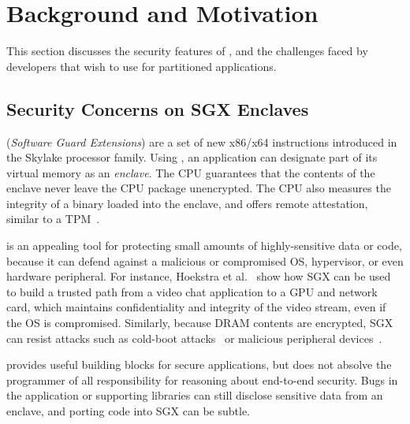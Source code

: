 \section{Background and Motivation}
\label{sec:background}

This section discusses the security features of  \sgx{}, and the challenges faced by developers that
wish to use \sgx{} for partitioned \java{} applications.

\subsection{Security Concerns on SGX Enclaves}

\intel{} \sgx{} ({\it Software Guard Extensions})
are a set of new x86/x64 instructions
introduced in the \intel{} Skylake processor family.
Using \sgx{}, an 
application can designate part of its virtual memory as an {\em enclave}.
The CPU guarantees that the contents of the enclave never leave the CPU package unencrypted.
The CPU also measures the integrity of a binary loaded into the enclave, and offers remote attestation,
similar to a TPM~\citep{TPM}.


\sgx{} is an appealing tool for protecting small amounts of highly-sensitive data or code, because it can defend 
against a malicious or compromised OS, hypervisor, or even hardware peripheral.
For instance, Hoekstra et al.~\citep{sgx-workshop1} show how SGX can be used
to build a trusted path from a video chat application to a GPU and network card, which maintains confidentiality and integrity of the
video stream, even if the OS is compromised.
Similarly, because DRAM contents are encrypted, SGX can resist attacks such as cold-boot attacks~\citep{halderman09coldboot} or 
malicious peripheral devices~\citep{hudson15thunderstrike}.

\sgx{} provides useful building blocks for secure applications, but does not
absolve the programmer of all responsibility for reasoning about end-to-end security.
Bugs in the application or supporting libraries can still disclose sensitive data from an enclave,
and porting code into SGX can be subtle.


